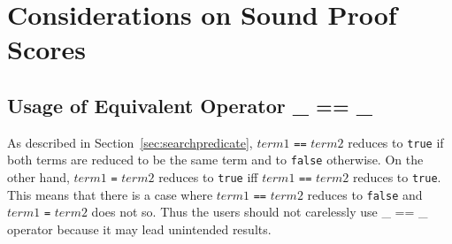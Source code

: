 \documentclass[12pt]{report}
\begin{document}
\section{Considerations on Sound Proof Scores}
\label{sec:soundProof}
\subsection{Usage of Equivalent Operator \_ == \_}
As described in Section~\ref{sec:searchpredicate}, $term1$ {\tt ==}
$term2$ reduces to {\tt true} if both terms are reduced to be the same
term and to {\tt false} otherwise. On the other hand, $term1$ {\tt =}
$term2$ reduces to {\tt true} iff $term1$ {\tt ==} $term2$ reduces to
{\tt true}. This means that there is a case where $term1$ {\tt ==}
$term2$ reduces to {\tt false} and $term1$ {\tt =} $term2$ does not
so. Thus the users should not carelessly use \_ == \_ operator because
it may lead unintended results.
\end{document}
